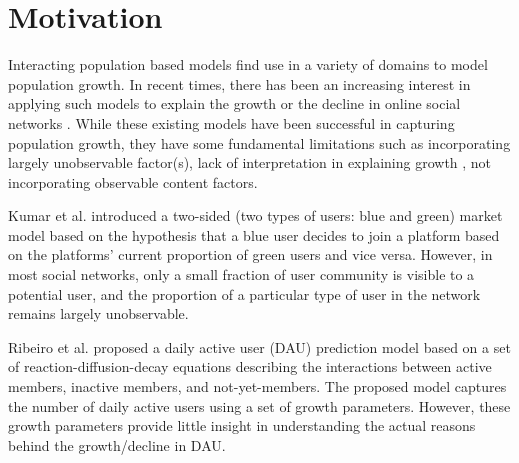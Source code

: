 \section{Motivation}
 Interacting population based models find use in a variety of domains to model population growth. In recent times, there has been an increasing interest in applying such models to explain the growth or the decline in online social networks \cite{Ribeiro2014,Kumar2010}. While these existing models have been successful in capturing population growth,  they have some fundamental limitations such as incorporating largely unobservable factor(s), lack of interpretation in explaining growth , not incorporating observable content factors. %

Kumar et al. \cite{Kumar2010} introduced a two-sided (two types of users: blue and green) market model based on the hypothesis that a blue user decides to join a platform based on the platforms' current proportion of green users and vice versa. However, in most social networks, only a small fraction of user community is visible to a potential user, and the proportion of a particular type of user in the network remains largely unobservable. 

Ribeiro et al. \cite{Ribeiro2014} proposed a daily active user (DAU) prediction model based on a set of reaction-diffusion-decay equations describing the interactions between active members, inactive members, and not-yet-members. The proposed model captures the number of daily active users using a set of growth parameters. However, these growth parameters provide little insight in understanding the actual reasons behind the growth/decline in DAU. 

